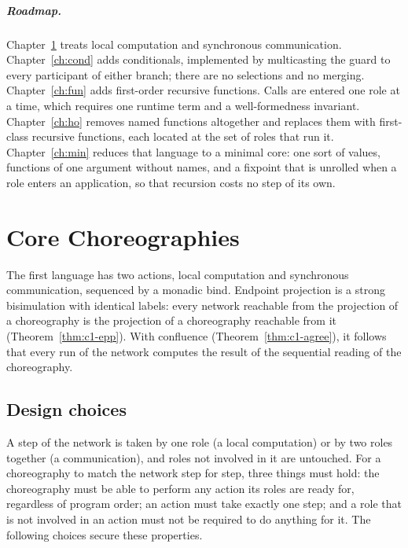 \documentclass[11pt]{report}
\theoremstyle{plain}
\theoremstyle{definition}
\theoremstyle{remark}
\begin{document}
\paragraph{Roadmap.}
Chapter~\ref{ch:core} treats local computation and synchronous
communication.  Chapter~\ref{ch:cond} adds conditionals, implemented by
multicasting the guard to every participant of either branch; there are no
selections and no merging.  Chapter~\ref{ch:fun} adds first-order recursive
functions.  Calls are entered one role at a time, which requires one runtime
term and a well-formedness invariant.  Chapter~\ref{ch:ho} removes named
functions altogether and replaces them with first-class recursive functions,
each located at the set of roles that run it.  Chapter~\ref{ch:min} reduces
that language to a minimal core: one sort of values, functions of one
argument without names, and a fixpoint that is unrolled when a role enters an
application, so that recursion costs no step of its own.

\chapter{Core Choreographies}
\label{ch:core}

The first language has two actions, local computation and synchronous
communication, sequenced by a monadic bind.  Endpoint projection is a strong
bisimulation with identical labels: every network reachable from the
projection of a choreography is the projection of a choreography reachable
from it (Theorem~\ref{thm:c1-epp}).  With confluence
(Theorem~\ref{thm:c1-agree}), it follows that every run of the network
computes the result of the sequential reading of the choreography.

\section{Design choices}
\label{sec:c1-choices}

A step of the network is taken by one role (a local computation) or by two
roles together (a communication), and roles not involved in it are untouched.
For a choreography to match the network step for step, three things must
hold: the choreography must be able to perform any action its roles are ready
for, regardless of program order; an action must take exactly one step; and a
role that is not involved in an action must not be required to do anything for
it.  The following choices secure these properties.
\end{document}
